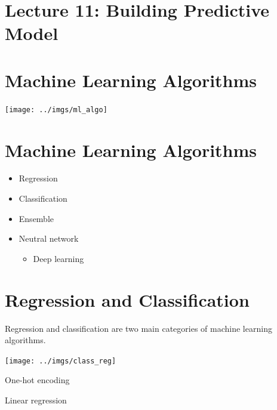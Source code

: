 \documentclass[]{article}
\newenvironment{Shaded}{\begin{snugshade}}{\end{snugshade}}
\newcommand{\KeywordTok}[1]{\textcolor[rgb]{0.13,0.29,0.53}{\textbf{#1}}}
\newcommand{\NormalTok}[1]{#1}
\providecommand{\tightlist}{%
  \setlength{\itemsep}{0pt}\setlength{\parskip}{0pt}}
\begin{document}
\begin{Shaded}
\begin{Highlighting}[]
{{{{{{{\KeywordTok{shinyApp}\NormalTok{(ui, server)}
\end{Highlighting}
\end{Shaded}

\hypertarget{lecture-11-building-predictive-model}{%
\section{Lecture 11: Building Predictive
Model}\label{lecture-11-building-predictive-model}}

\hypertarget{machine-learning-algorithms}{%
\section{Machine Learning
Algorithms}\label{machine-learning-algorithms}}

\begin{center}\texttt{[image: ../imgs/ml\_algo]} \end{center}

\hypertarget{machine-learning-algorithms-1}{%
\section{Machine Learning
Algorithms}\label{machine-learning-algorithms-1}}

\begin{itemize}
\tightlist
\item
  Regression
\item
  Classification
\item
  Ensemble
\item
  Neutral network

  \begin{itemize}
  \tightlist
  \item
    Deep learning
  \end{itemize}
\end{itemize}

\hypertarget{regression-and-classification}{%
\section{Regression and
Classification}\label{regression-and-classification}}

Regression and classification are two main categories of machine
learning algorithms.

\begin{center}\texttt{[image: ../imgs/class\_reg]} \end{center}

One-hot encoding

Linear regression
\end{document}
